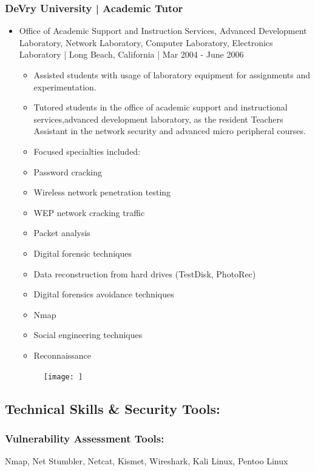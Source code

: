 \documentclass[letter,10pt]{article}
\begin{document}
\subsubsection*{DeVry University | Academic Tutor}
\label{sec:orgc6e3cda}
\begin{itemize}
\item Office of Academic Support and Instruction Services, Advanced Development Laboratory, Network Laboratory, Computer Laboratory, Electronics Laboratory | Long Beach, California | Mar 2004 - June 2006
\label{sec:org9ee3dc3}
\begin{itemize}
\item Assisted students with usage of laboratory equipment for assignments and experimentation.
\item Tutored students in the office of academic support and instructional services,advanced development laboratory, as the resident Teachers Assistant in the network security and advanced micro peripheral courses.
\item Focused specialties included:
\item Password cracking
\item Wireless network penetration testing
\item WEP network cracking traffic
\item Packet analysis
\item Digital forensic techniques
\item Data reconstruction from hard drives (TestDisk, PhotoRec)
\item Digital forensics avoidance techniques
\item Nmap
\item Social engineering techniques
\item Reconnaissance
\end{itemize}
\begin{figure}
\texttt{[image: ]}
\end{figure}
\end{itemize}

\subsection*{Technical Skills \& Security Tools:}
\label{sec:orge19c9b4}
\subsubsection*{Vulnerability Assessment Tools:}
\label{sec:orgd402579}
Nmap, Net Stumbler, Netcat, Kismet, Wireshark, Kali Linux, Pentoo Linux
\end{document}

